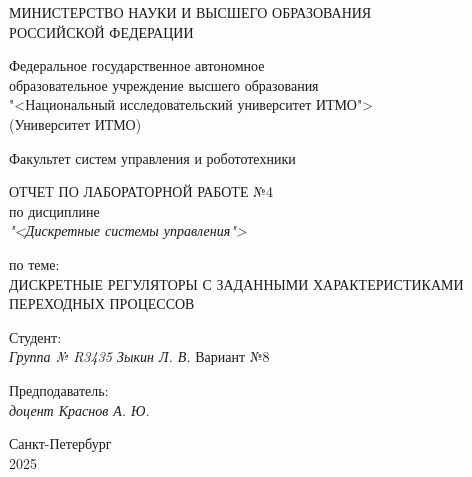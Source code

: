 \thispagestyle{empty}

\begin{center}
    МИНИСТЕРСТВО НАУКИ И ВЫСШЕГО ОБРАЗОВАНИЯ \\ РОССИЙСКОЙ ФЕДЕРАЦИИ

    \vspace{20pt}

    Федеральное государственное автономное \\ образовательное учреждение высшего образования \\
    "<Национальный исследовательский университет ИТМО"> \\
    (Университет ИТМО)

    \vspace{20pt}

    Факультет систем управления и робототехники
\end{center}

\vfill

\begin{center}
    ОТЧЕТ ПО ЛАБОРАТОРНОЙ РАБОТЕ №4\\  
    по дисциплине \\
    \textit{"<Дискретные системы управления">}

    \vspace{20pt}

    по теме: \\
    \uppercase{Дискретные регуляторы с заданными характеристиками переходных процессов}
\end{center}

\vfill

    \noindent Студент: \\
    \textit{Группа № R3435 \hfill Зыкин Л. В.}
    \noindent Вариант №8 \\
    \vspace{20pt}

    \noindent Предподаватель: \\
    \textit{доцент \hfill Краснов А. Ю.}

\vfill

\begin{center}
    Санкт-Петербург \\ 2025
\end{center}